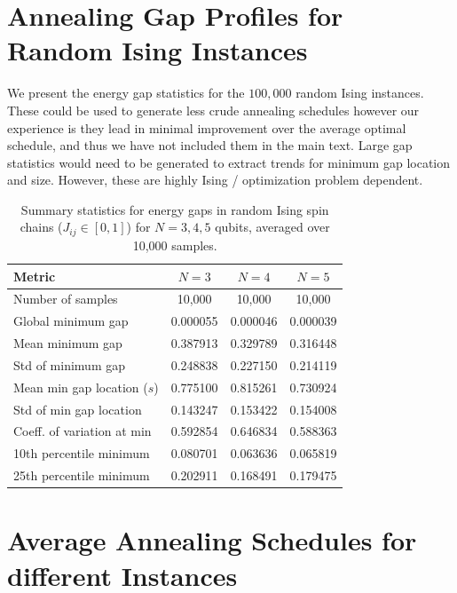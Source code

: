 \section{Annealing Gap Profiles for Random Ising Instances}\label{sec:appendix_gap_statistics}
\qquad We present the energy gap statistics for the $100,000$ random Ising instances. These could be used to generate less crude annealing schedules however our experience is they lead in minimal improvement over the average optimal schedule, and thus we have not included them in the main text. Large gap statistics would need to be generated to extract trends for minimum gap location and size. However, these are highly Ising / optimization problem dependent. 
\begin{table}[htbp]
    \centering
    \begin{tabular}{lccc}
        \hline
        Metric & $N=3$ & $N=4$ & $N=5$ \\
        \hline
        Number of samples & 10,000 & 10,000 & 10,000 \\
        Global minimum gap & 0.000055 & 0.000046 & 0.000039 \\
        Mean minimum gap & 0.387913 & 0.329789 & 0.316448 \\
        Std of minimum gap & 0.248838 & 0.227150 & 0.214119 \\
        Mean min gap location ($s$) & 0.775100 & 0.815261 & 0.730924 \\
        Std of min gap location & 0.143247 & 0.153422 & 0.154008 \\
        Coeff. of variation at min & 0.592854 & 0.646834 & 0.588363 \\
        10th percentile minimum & 0.080701 & 0.063636 & 0.065819 \\
        25th percentile minimum & 0.202911 & 0.168491 & 0.179475 \\
        \hline
    \end{tabular}
    \caption{Summary statistics for energy gaps in random Ising spin chains ($J_{ij}\in[0,1]$) for $N=3,4,5$ qubits, averaged over 10,000 samples.}
\end{table}
\newpage
\section{Average Annealing Schedules for different Instances}\label{sec:appendix_larger_annealings}

